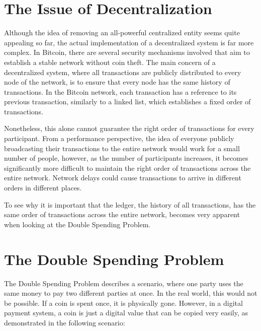 \documentclass[a4paper, 12pt]{report}
\begin{document}
\section{The Issue of Decentralization}

\par Although the idea of removing an all-powerful centralized entity seems quite appealing so far, the actual implementation of a decentralized system is far more complex. In Bitcoin, there are several security mechanisms involved that aim to establish a stable network without coin theft. The main concern of a decentralized system, where all transactions are publicly distributed to every node of the network, is to ensure that every node has the same history of transactions. In the Bitcoin network, each transaction has a reference to its previous transaction, similarly to a linked list, which establishes a fixed order of transactions.

\par Nonetheless, this alone cannot guarantee the right order of transactions for every participant. From a performance perspective, the idea of everyone publicly broadcasting their transactions to the entire network would work for a small number of people, however, as the number of participants increases, it becomes significantly more difficult to maintain the right order of transactions across the entire network. Network delays could cause transactions to arrive in different orders in different places.

\par To see why it is important that the ledger, the history of all transactions, has the same order of transactions across the entire network, becomes very apparent when looking at the Double Spending Problem.

\section{The Double Spending Problem}

\par The Double Spending Problem describes a scenario, where one party uses the same money to pay two different parties at once. In the real world, this would not be possible. If a coin is spent once, it is physically gone. However, in a digital payment system, a coin is just a digital value that can be copied very easily, as demonstrated in the following scenario:
\end{document}
